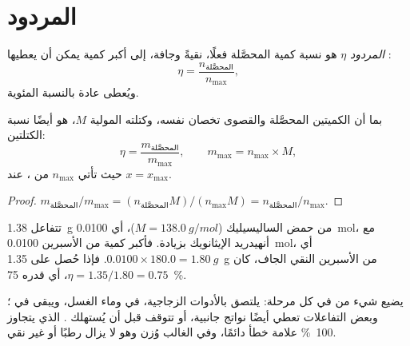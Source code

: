\section{المردود}

\begin{definition}[المردود]\label{def:g10:synthesis-yield:yield}
\emph{المردود} $\eta$  هو نسبة كمية  المحصَّلة فعلًا،
نقيةً وجافة، إلى أكبر كمية يمكن أن يعطيها :
\[
  \eta = \frac{n_{\text{المحصَّلة}}}{n_{\max}} ,
\]
ويُعطى عادة بالنسبة المئوية.
\end{definition}

\begin{proposition}\label{prop:g10:synthesis-yield:masses}
بما أن الكميتين المحصَّلة والقصوى تخصان  نفسه، وكتلته المولية
$M$،  هو أيضًا نسبة الكتلتين:
\[
  \eta = \frac{m_{\text{المحصَّلة}}}{m_{\max}},
  \qquad m_{\max} = n_{\max} \times M,
\]
حيث تأتي $n_{\max}$ من ، عند $x = x_{\max}$.
\end{proposition}

\begin{proof}
$m_{\text{المحصَّلة}} / m_{\max} = (n_{\text{المحصَّلة}} M) / (n_{\max} M)
= n_{\text{المحصَّلة}} / n_{\max}$.
\end{proof}

\begin{example}\label{ex:g10:synthesis-yield:small}
تتفاعل \qty{1.38}{g} من حمض الساليسيليك ($M = \qty{138.0}{g/mol}$)، أي
\qty{0.0100}{mol}، مع أنهيدريد الإيثانويك بزيادة. فأكبر كمية من الأسبرين
\qty{0.0100}{mol}، أي $0.0100 \times 180.0 = \qty{1.80}{g}$. فإذا حُصل على
\qty{1.35}{g} من الأسبرين النقي الجاف، كان $\eta = 1.35 / 1.80 = 0.75$، أي
 قدره \qty{75}{\percent}.
\end{example}

\begin{remark}\label{rem:g10:synthesis-yield:below}
يضيع شيء من  في كل مرحلة: يلتصق بالأدوات الزجاجية،  في  وماء
الغسل، ويبقى في ؛ وبعض التفاعلات تعطي أيضًا نواتج جانبية، أو تتوقف
قبل أن يُستهلك .  الذي يتجاوز \qty{100}{\percent}
علامة خطأ دائمًا، وفي الغالب  وُزن وهو لا يزال رطبًا أو غير نقي.
\end{remark}

